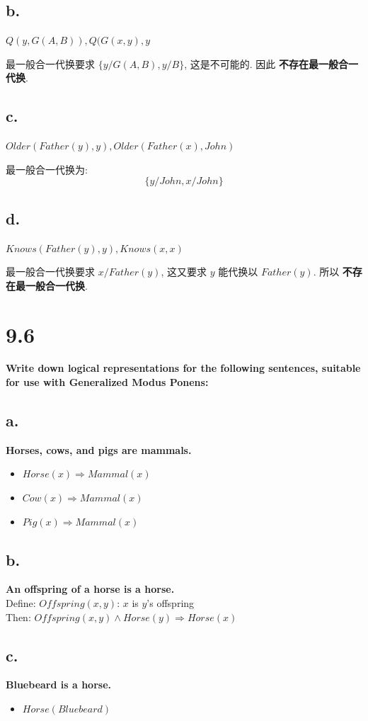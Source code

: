 \documentclass[UTF8]{article}
\newcommand{\jumpLine} {\hspace*{\fill} \par}
\begin{document}
\subsection*{b.}
\noindent \textbf{$Q(y,G(A,B)),Q(G(x,y),y$}\\\jumpLine\noindent
最一般合一代换要求 $\{y/G(A,B),y/B\}$, 这是不可能的. 因此 \textbf{不存在最一般合一代换}.
\subsection*{c.}
\noindent \textbf{$Older(Father(y),y),Older(Father(x), John)$}\\\jumpLine\noindent
最一般合一代换为:
$$\{y/John, x/John\}$$
\subsection*{d.}
\noindent \textbf{$Knows(Father(y),y),Knows(x,x)$}\\\jumpLine\noindent
最一般合一代换要求 $x/Father(y)$, 这又要求 $y$ 能代换以 $Father(y)$. 所以 \textbf{不存在最一般合一代换}.

\section*{9.6}
\noindent \textbf{Write down logical representations for the following sentences, suitable for use with Generalized Modus Ponens: }\\
\subsection*{a.}
\noindent \textbf{Horses, cows, and pigs are mammals.}
\begin{itemize}
	\item $Horse(x)\Rightarrow Mammal(x)$
	\item $Cow(x)\Rightarrow Mammal(x)$
	\item $Pig(x)\Rightarrow Mammal(x)$
\end{itemize}
\subsection*{b.}
\noindent \textbf{An offspring of a horse is a horse.}\\
Define: $Offspring(x,y)$: $x$ is $y$'s offspring \\
Then: $Offspring(x,y)\land Horse(y)\Rightarrow Horse(x)$
\subsection*{c.}
\noindent \textbf{Bluebeard is a horse.}
\begin{itemize}
	\item $Horse(Bluebeard)$
\end{itemize}
\end{document}
